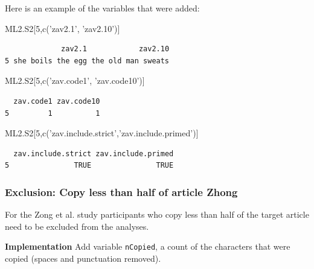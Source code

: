 \documentclass[]{article}
\newenvironment{Shaded}{\begin{snugshade}}{\end{snugshade}}
\newcommand{\KeywordTok}[1]{\textcolor[rgb]{0.94,0.87,0.69}{{#1}}}
\newcommand{\DecValTok}[1]{\textcolor[rgb]{0.86,0.86,0.80}{{#1}}}
\newcommand{\StringTok}[1]{\textcolor[rgb]{0.80,0.58,0.58}{{#1}}}
\newcommand{\NormalTok}[1]{\textcolor[rgb]{0.80,0.80,0.80}{{#1}}}
\begin{document}
Here is an example of the variables that were added:

\begin{Shaded}
\begin{Highlighting}[]
\NormalTok{ML2.S2[}\DecValTok{5}\NormalTok{,}\KeywordTok{c}\NormalTok{(}\StringTok{'zav2.1'}\NormalTok{, }\StringTok{'zav2.10'}\NormalTok{)]}
\end{Highlighting}
\end{Shaded}

\begin{verbatim}
             zav2.1            zav2.10
5 she boils the egg the old man sweats
\end{verbatim}

\begin{Shaded}
\begin{Highlighting}[]

\NormalTok{ML2.S2[}\DecValTok{5}\NormalTok{,}\KeywordTok{c}\NormalTok{(}\StringTok{'zav.code1'}\NormalTok{, }\StringTok{'zav.code10'}\NormalTok{)]}
\end{Highlighting}
\end{Shaded}

\begin{verbatim}
  zav.code1 zav.code10
5         1          1
\end{verbatim}

\begin{Shaded}
\begin{Highlighting}[]

\NormalTok{ML2.S2[}\DecValTok{5}\NormalTok{,}\KeywordTok{c}\NormalTok{(}\StringTok{'zav.include.strict'}\NormalTok{,}\StringTok{'zav.include.primed'}\NormalTok{)]}
\end{Highlighting}
\end{Shaded}

\begin{verbatim}
  zav.include.strict zav.include.primed
5               TRUE               TRUE
\end{verbatim}

\subsubsection{\textbf{Exclusion:} Copy less than half of article
Zhong}\label{exclusion-copy-less-than-half-of-article-zhong}

For the Zong et al. study participants who copy less than half of the
target article need to be excluded from the analyses.

\textbf{Implementation} Add variable \texttt{nCopied}, a count of the
characters that were copied (spaces and punctuation removed).
\end{document}
